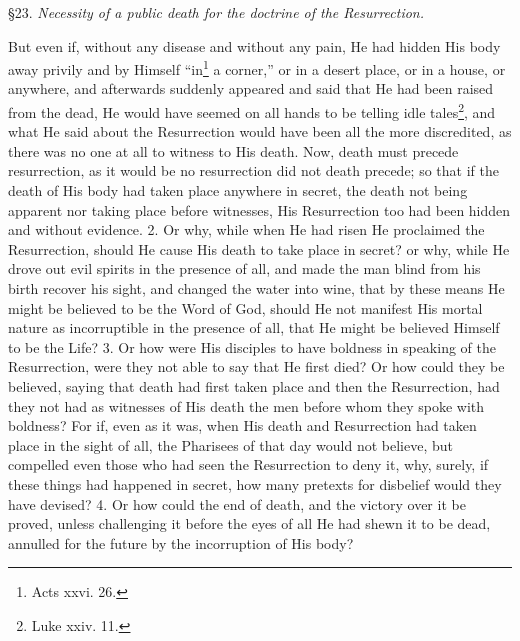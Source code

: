 
§23. \emph{Necessity of a public death for the doctrine of the Resurrection.}

But even if, without any disease and without any pain, He had hidden His body away privily and by Himself “in\footnote{Acts xxvi. 26.} a corner,” or in a desert place, or in a house, or anywhere, and afterwards suddenly appeared and said that He had been raised from the dead, He would have seemed on all hands to be telling idle tales\footnote{Luke xxiv. 11.}, and what He said about the Resurrection would have been all the more discredited, as there was no one at all to witness to His death. Now, death must precede resurrection, as it would be no resurrection did not death precede; so that if the death of His body had taken place anywhere in secret, the death not being apparent nor taking place before witnesses, His Resurrection too had been hidden and without evidence. 2. Or why, while when He had risen He proclaimed the Resurrection, should He cause His death to take place in secret? or why, while He drove out evil spirits in the presence of all, and made the man blind from his birth recover his sight, and changed the water into wine, that by these means He might be believed to be the Word of God, should He not manifest His mortal nature as incorruptible in the presence of all, that He might be believed Himself to be the Life? 3. Or how were His disciples to have boldness in speaking of the Resurrection, were they not able to say that He first died? Or how could they be believed, saying that death had first taken place and then the Resurrection, had they not had as witnesses of His death the men before whom they spoke with boldness? For if, even as it was, when His death and Resurrection had taken place in the sight of all, the Pharisees of that day would not believe, but compelled even those who had seen the Resurrection to deny it, why, surely, if these things had happened in secret, how many pretexts for disbelief would they have devised? 4. Or how could the end of death, and the victory over it be proved, unless challenging it before the eyes of all He had shewn it to be dead, annulled for the future by the incorruption of His body?


